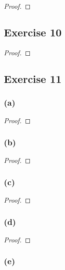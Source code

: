 \documentclass[14pt]{extarticle}
\begin{document}
\begin{proof}

\end{proof}

\subsection{Exercise 10}

\begin{proof}

\end{proof}

\subsection{Exercise 11}

\subsubsection{(a)}

\begin{proof}

\end{proof}

\subsubsection{(b)}

\begin{proof}

\end{proof}

\subsubsection{(c)}

\begin{proof}

\end{proof}

\subsubsection{(d)}

\begin{proof}

\end{proof}

\subsubsection{(e)}
\end{document}
